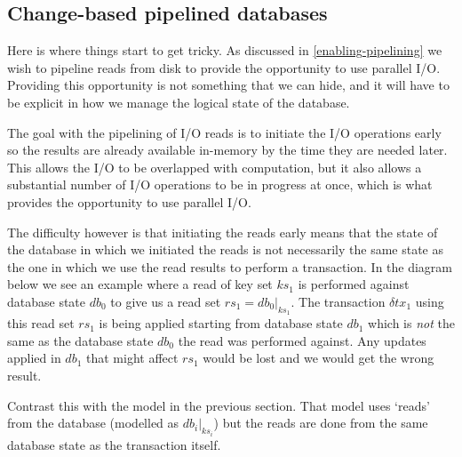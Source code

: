 \documentclass[11pt,a4paper]{article}
\newcommand\restrict[2]{\left.#1\right|_{#2}}
\begin{document}
\subsection{Change-based pipelined databases}

Here is where things start to get tricky. As discussed in
\cref{enabling-pipelining} we wish to pipeline reads from disk to provide the
opportunity to use parallel I/O. Providing this opportunity is not something
that we can hide, and it will have to be explicit in how we manage the logical
state of the database.

The goal with the pipelining of I/O reads is to initiate the I/O operations
early so the results are already available in-memory by the time they are
needed later. This allows the I/O to be overlapped with computation, but it also
allows a substantial number of I/O operations to be in progress at once, which
is what provides the opportunity to use parallel I/O.

The difficulty however is that initiating the reads early means that the state
of the database in which we initiated the reads is not necessarily the same
state as the one in which we use the read results to perform a transaction.
In the diagram below we see an example where a read of key set $\mathit{ks}_1$
is performed against database state $\mathit{db}_0$ to give us a read set
$\mathit{rs}_1 = \restrict{\mathit{db}_0}{\mathit{ks}_1}$. The transaction
$\delta\mathit{tx}_1$ using this read set $\mathit{rs}_1$ is being applied
starting from database state $\mathit{db}_1$ which is \emph{not} the same as
the database state $\mathit{db}_0$ the read was performed against. Any updates
applied in $\mathit{db}_1$ that might affect $\mathit{rs}_1$ would be lost and
we would get the wrong result.
\begin{center}
\end{center}
Contrast this with the model in the previous section. That model uses `reads'
from the database (modelled as $\restrict{\mathit{db}_i}{\mathit{ks}_i}$) but
the reads are done from the same database state as the transaction itself.
\end{document}
